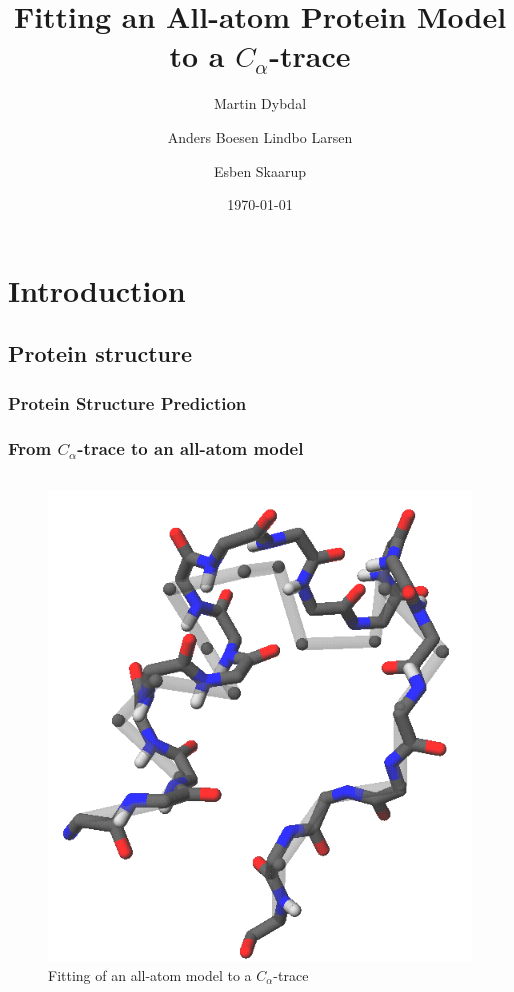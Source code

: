 \documentclass{beamer}
\title{Fitting an All-atom Protein Model to a $C_{\alpha}$-trace}
\author{\small Martin Dybdal \and Anders Boesen Lindbo Larsen \and Esben Skaarup}
\institute{\textrm{Datalogisk Institut, Københavns Universitet}}
\date{\today}
\begin{document}
\frame{\titlepage}

\section{Introduction}
\subsection{Protein structure}

\begin{frame}[t, fragile]
  \frametitle{Protein Structure Prediction}
  
\end{frame}

\begin{frame}[t, fragile]
  \frametitle{From $C_\alpha$-trace to an all-atom model}
  \begin{columns}
    \column{5cm}
  \begin{figure}
    \centering
    \includegraphics[width=\textwidth]{../rapport/figures/forside.png}
    \caption{Fitting of an all-atom model to a $C_\alpha$-trace}
    \label{fig:front}
  \end{figure}

  \column{5cm}


\end{columns}
\end{frame}
\end{document}
